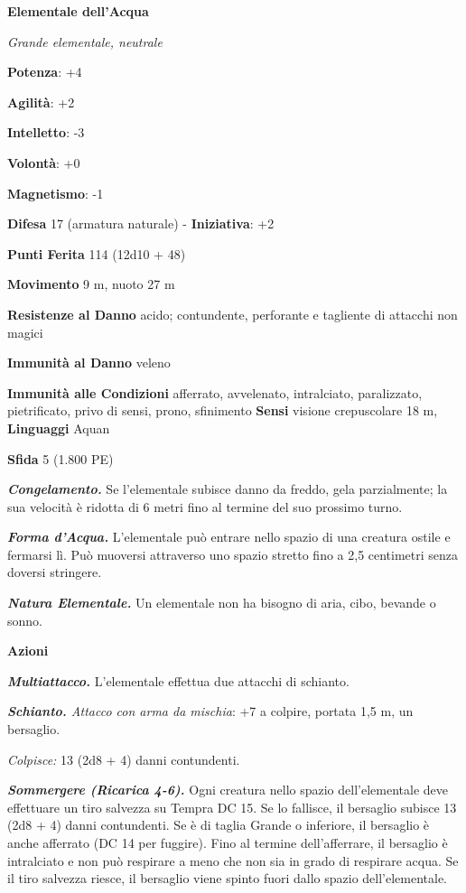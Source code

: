 \begin{multicols}{2}
\textbf{Elementale dell'Acqua}

\emph{Grande elementale, neutrale}

\textbf{Potenza}: +4

\textbf{Agilità}: +2

\textbf{Intelletto}: -3

\textbf{Volontà}: +0

\textbf{Magnetismo}: -1

\textbf{Difesa} 17 (armatura naturale) - \textbf{Iniziativa}: +2

\textbf{Punti Ferita} 114 (12d10 + 48)

\textbf{Movimento} 9 m, nuoto 27 m

\textbf{Resistenze al Danno} acido; contundente, perforante e tagliente
di attacchi non magici

\textbf{Immunità al Danno} veleno

\textbf{Immunità alle Condizioni} afferrato, avvelenato, intralciato,
paralizzato, pietrificato, privo di sensi, prono, sfinimento
\textbf{Sensi} visione crepuscolare 18 m, 
\textbf{Linguaggi} Aquan

\textbf{Sfida} 5 (1.800 PE)

\emph{\textbf{Congelamento.}} Se l'elementale subisce danno da freddo,
gela parzialmente; la sua velocità è ridotta di 6 metri fino al termine
del suo prossimo turno.

\emph{\textbf{Forma d'Acqua.}} L'elementale può entrare nello spazio di
una creatura ostile e fermarsi lì. Può muoversi attraverso uno spazio
stretto fino a 2,5 centimetri senza doversi stringere.

\emph{\textbf{Natura Elementale.}} Un elementale non ha bisogno di aria,
cibo, bevande o sonno.

\textbf{Azioni}

\emph{\textbf{Multiattacco.}} L'elementale effettua due attacchi di
schianto.

\emph{\textbf{Schianto.} Attacco con arma da mischia}: +7 a colpire,
portata 1,5 m, un bersaglio.

\emph{Colpisce:} 13 (2d8 + 4) danni contundenti.

\emph{\textbf{Sommergere (Ricarica 4-6).}} Ogni creatura nello spazio
dell'elementale deve effettuare un tiro salvezza su Tempra DC 15. Se lo
fallisce, il bersaglio subisce 13 (2d8 + 4) danni contundenti. Se è di
taglia Grande o inferiore, il bersaglio è anche afferrato (DC 14 per
fuggire). Fino al termine dell'afferrare, il bersaglio è intralciato e
non può respirare a meno che non sia in grado di respirare acqua. Se il
tiro salvezza riesce, il bersaglio viene spinto fuori dallo spazio
dell'elementale.


\end{multicols}

